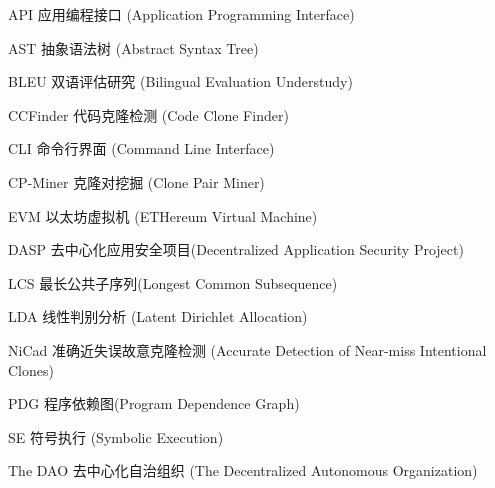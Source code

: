 
\begin{denotation}[3cm]

  \item[API] 应用编程接口 (Application Programming Interface)
  \item[AST] 抽象语法树 (Abstract Syntax Tree)
  \item[BLEU] 双语评估研究 (Bilingual Evaluation Understudy)
  \item[CCFinder] 代码克隆检测 (Code Clone Finder) 
  \item[CLI] 命令行界面 (Command Line Interface)
  \item[CP-Miner] 克隆对挖掘 (Clone Pair Miner)
  \item[EVM] 以太坊虚拟机 (ETHereum Virtual Machine)
  \item[DASP] 去中心化应用安全项目(Decentralized Application Security Project)
  \item[LCS] 最长公共子序列(Longest Common Subsequence)
  \item[LDA] 线性判别分析 (Latent Dirichlet Allocation)
  \item[NiCad] 准确近失误故意克隆检测 (Accurate Detection of Near-miss Intentional Clones)
  \item[PDG] 程序依赖图(Program Dependence Graph)
  \item[SE] 符号执行 (Symbolic Execution)
  \item[The DAO] 去中心化自治组织 (The Decentralized Autonomous Organization)

\end{denotation}





